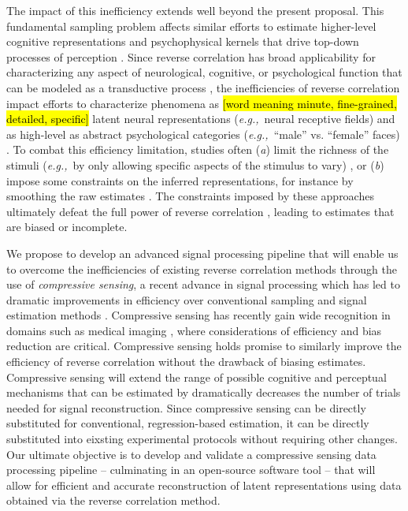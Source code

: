 \documentclass[11pt, notitlepage]{article} %
\def\eg{{\emph{e.g.,}}~}
\begin{document}
The impact of this inefficiency extends well beyond the present proposal.
This fundamental sampling problem affects similar efforts to estimate higher-level
cognitive representations and psychophysical kernels that drive top-down processes of perception
\cite{ahumadaStimulusFeaturesSignal1971,neriReceptivePerceptiveFields2006,gosselinSuperstitiousPerceptionsReveal2003,smithMeasuringInternalRepresentations2012}.
Since reverse correlation has broad applicability for characterizing any aspect
of neurological, cognitive, or psychological function that can be modeled as a transductive process
\cite{ringachReverseCorrelationNeurophysiology2004},
the inefficiencies of reverse correlation impact efforts
to characterize phenomena as \hl{[word meaning minute, fine-grained, detailed, specific]} latent neural representations (\eg neural receptive fields) \cite{ringachReverseCorrelationNeurophysiology2004}
and as high-level  as abstract psychological categories (\eg ``male'' vs. ``female'' faces)
\cite{brinkmanVisualisingMentalRepresentations2017,ponsotCrackingSocialCode2018,manginiMakingIneffableExplicit2004}.
To combat this efficiency limitation, studies often 
(\emph{a}) limit the richness of the stimuli (\eg by only allowing specific aspects of the stimulus to vary)
\cite{gosselinBubblesTechniqueReveal2001},
or (\emph{b}) impose some constraints on the inferred representations,
for instance by smoothing the raw estimates \cite{gosselinSuperstitiousPerceptionsReveal2003}.
The constraints imposed by these approaches ultimately defeat the full power of reverse correlation
\cite{murrayTroublesBubbles2004},
leading to estimates that are biased or incomplete.

We propose to develop an advanced signal processing pipeline
that will enable us to overcome the inefficiencies of existing reverse correlation methods
through the use of \emph{compressive sensing},
a recent advance in signal processing which has led to dramatic improvements in efficiency
over conventional sampling and signal estimation methods
\cite{baraniukCompressiveSensingLecture2007}.
Compressive sensing has recently gain wide recognition in domains such as medical imaging
\cite{graffCompressiveSensingMedical2015,lustigCompressedSensingMRI2008},
where considerations of efficiency and bias reduction are critical.
Compressive sensing holds promise to similarly improve the efficiency of reverse correlation
without the drawback of biasing estimates.
Compressive sensing will extend the range of possible cognitive and perceptual mechanisms that can be estimated
by dramatically decreases the number of trials needed for signal reconstruction.
Since compressive sensing can be directly substituted for conventional, regression-based estimation,
it can be directly substituted into eixsting experimental protocols without requiring other changes.
Our ultimate objective is to develop and validate a compressive sensing
data processing pipeline – culminating in an open-source software tool – that will allow for
efficient and accurate reconstruction of latent representations using data 
obtained via the reverse correlation method.
\end{document}
